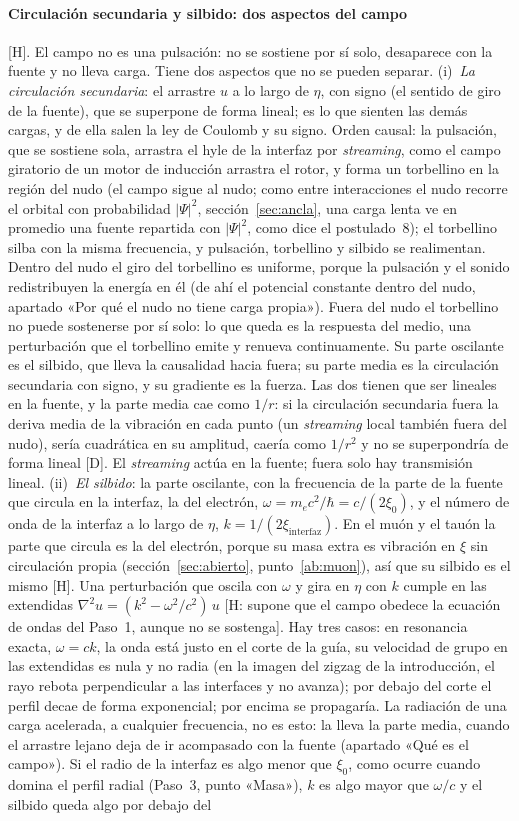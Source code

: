 \documentclass[11pt,a4paper]{article}
\newcommand{\st}[1]{\textup{[#1]}}
\newcommand{\apartado}[1]{\paragraph{#1}}
\begin{document}
\apartado{Circulación secundaria y silbido: dos aspectos del campo} \st{H}. El campo no es una pulsación: no se sostiene por sí solo, desaparece con la fuente y no lleva carga. Tiene dos aspectos que no se pueden separar. (i)~\emph{La circulación secundaria}: el arrastre $u$ a lo largo de $\eta$, con signo (el sentido de giro de la fuente), que se superpone de forma lineal; es lo que sienten las demás cargas, y de ella salen la ley de Coulomb y su signo. Orden causal: la pulsación, que se sostiene sola, arrastra el hyle de la interfaz por \emph{streaming}, como el campo giratorio de un motor de inducción arrastra el rotor, y forma un torbellino en la región del nudo (el campo sigue al nudo; como entre interacciones el nudo recorre el orbital con probabilidad $|\Psi|^2$, sección~\ref{sec:ancla}, una carga lenta ve en promedio una fuente repartida con $|\Psi|^2$, como dice el postulado~8); el torbellino silba con la misma frecuencia, y pulsación, torbellino y silbido se realimentan. Dentro del nudo el giro del torbellino es uniforme, porque la pulsación y el sonido redistribuyen la energía en él (de ahí el potencial constante dentro del nudo, apartado «Por qué el nudo no tiene carga propia»). Fuera del nudo el torbellino no puede sostenerse por sí solo: lo que queda es la respuesta del medio, una perturbación que el torbellino emite y renueva continuamente. Su parte oscilante es el silbido, que lleva la causalidad hacia fuera; su parte media es la circulación secundaria con signo, y su gradiente es la fuerza. Las dos tienen que ser lineales en la fuente, y la parte media cae como $1/r$: si la circulación secundaria fuera la deriva media de la vibración en cada punto (un \emph{streaming} local también fuera del nudo), sería cuadrática en su amplitud, caería como $1/r^2$ y no se superpondría de forma lineal \st{D}. El \emph{streaming} actúa en la fuente; fuera solo hay transmisión lineal. (ii)~\emph{El silbido}: la parte oscilante, con la frecuencia de la parte de la fuente que circula en la interfaz, la del electrón, $\omega=m_ec^2/\hbar=c/(2\xi_0)$, y el número de onda de la interfaz a lo largo de $\eta$, $k=1/(2\xi_{\mathrm{interfaz}})$. En el muón y el tauón la parte que circula es la del electrón, porque su masa extra es vibración en $\xi$ sin circulación propia (sección~\ref{sec:abierto}, punto~\ref{ab:muon}), así que su silbido es el mismo \st{H}. Una perturbación que oscila con $\omega$ y gira en $\eta$ con $k$ cumple en las extendidas $\nabla^2u=(k^2-\omega^2/c^2)\,u$ \st{H: supone que el campo obedece la ecuación de ondas del Paso~1, aunque no se sostenga}. Hay tres casos: en resonancia exacta, $\omega=ck$, la onda está justo en el corte de la guía, su velocidad de grupo en las extendidas es nula y no radia (en la imagen del zigzag de la introducción, el rayo rebota perpendicular a las interfaces y no avanza); por debajo del corte el perfil decae de forma exponencial; por encima se propagaría. La radiación de una carga acelerada, a cualquier frecuencia, no es esto: la lleva la parte media, cuando el arrastre lejano deja de ir acompasado con la fuente (apartado «Qué es el campo»). Si el radio de la interfaz es algo menor que $\xi_0$, como ocurre cuando domina el perfil radial (Paso~3, punto «Masa»), $k$ es algo mayor que $\omega/c$ y el silbido queda algo por debajo del 
\end{document}
